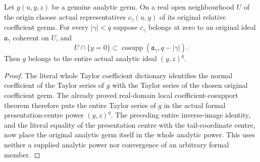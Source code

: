 \begin{theorem}
\label{hir:actual-local-coefficient-cosupport-analytic-centre-power}
\leanok
Let $g(u,y,z)$ be a genuine analytic germ. On a real open neighbourhood
$U$ of the origin choose actual representatives $c_\gamma(u,y)$ of its
original relative coefficient germs. For every $|\gamma|<q$ suppose
$c_\gamma$ belongs at zero to an original ideal $\mathfrak a_\gamma$
coherent on $U$, and
\[
 U\cap\{y=0\}\subset\operatorname{cosupp}
  (\mathfrak a_\gamma,q-|\gamma|).
\]
Then $g$ belongs to the entire actual analytic ideal $(y,z)^q$.
\end{theorem}
\begin{proof}
The literal whole Taylor coefficient dictionary identifies the normal
coefficient of the Taylor series of $g$ with the Taylor series of the
chosen original coefficient germ. The already proved real-domain local
coefficient-cosupport theorem therefore puts the entire Taylor series of
$g$ in the actual formal presentation-centre power $(y,z)^q$. The preceding
entire inverse-image identity, and the literal equality of the presentation
centre with the tail-coordinate centre, now place the original analytic
germ itself in the whole analytic power. This uses neither a supplied
analytic power nor convergence of an arbitrary formal member.
\end{proof}

